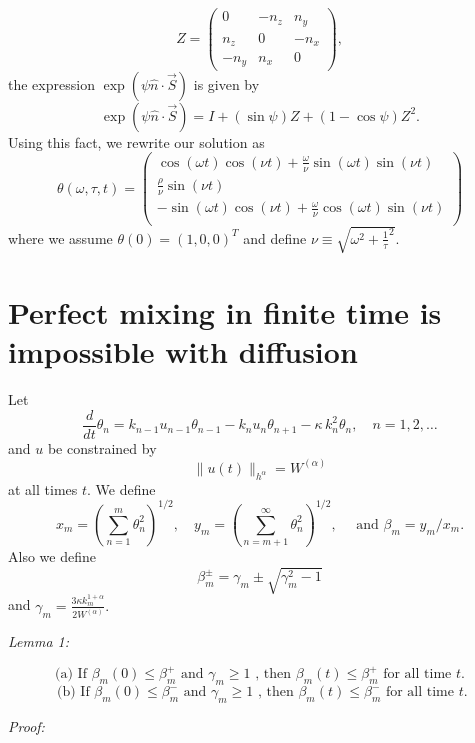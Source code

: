 \[
	Z=\left(
	\begin{array}{ccc}
		0      & -n_{z} & n_{y}  \\
		n_{z}  & 0      & -n_{x} \\
		-n_{y} & n_{x}  & 0
	\end{array}
	\right),
\]
the expression $\exp( \psi  \hat{n}\cdot \vec{S})$ is given by \cite{SLA2005}
\[\exp( \psi  \hat{n}\cdot \vec{S})=I+(\sin\psi)Z+(1-\cos\psi)Z^{2}.\]
Using this fact, we rewrite our solution as
\[
	\theta(\omega  , \tau, t)=
	\left(
	\begin{array}{c}
		\cos(\omega t) \cos(\nu t) + \frac{\omega}{\nu} \sin(\omega t) \sin(\nu t)  \\
		\frac{\rho}{\nu}  \sin(\nu t)                                               \\
		-\sin(\omega t) \cos(\nu t) + \frac{\omega}{\nu} \cos(\omega t) \sin(\nu t) \\
	\end{array}
	\right)
\]
where we assume $\theta(0)=(1, 0, 0)^{T}$  and define $\nu \equiv \sqrt{\omega^{2}+\frac{1}{\tau}^2}.$




\section{Perfect mixing in finite time is impossible with diffusion}
\label{appendix:pmift_impossible}

Let \begin{equation}
	\frac{d}{dt} \theta_{n}= k_{n-1}u_{n-1}\theta_{n-1}-k_{n}u_{n}\theta_{n+1} - \kappa \,  k_{n}^{2} \theta_{n}, \quad n=1,2,\dots
\end{equation}
and $u$ be constrained by
\begin{equation}
\label{eq:constraint}
\|u(t)\|_{h^{\alpha}}=W^{(\alpha)}
\end{equation}
at all times $t$. We define
\begin{equation}
\label{eq:xmymdef}
x_{m}=\left(\sum_{n=1}^{m}\theta_{n}^{2}\right)^{1/2}, \quad y_{m}=\left(\sum_{n=m+1}^{\infty}\theta_{n}^{2}\right)^{1/2}, \quad \text{ and } \beta_{m}=y_{m}/x_{m}.
\end{equation} 
Also we define \begin{equation*}
\beta_{m}^{\pm}=\gamma_{m}  \pm \sqrt{\gamma_{m}^{2}  - 1}
\end{equation*}
and $\gamma_{m} = \frac{3\kappa k_{m}^{1+\alpha} }{2W^{(\alpha)}}.$
\begin{flushleft}
{\it Lemma 1:} 
\end{flushleft}
\begin{equation}
\label{condtion_a} 
\text{ (a) If $\beta_{m}(0) \leq \beta_{m}^{+}$ and $\gamma_{m}\geq 1$ , then $\beta_{m}(t)\leq \beta_{m}^{+}$ for all time $t$. }
\end{equation}	
\begin{equation}
\label{condtion_b} 
\text{ (b) If $\beta_{m}(0) \leq \beta_{m}^{-}$ and $\gamma_{m}\geq 1$ , then $\beta_{m}(t)\leq \beta_{m}^{-}$ for all time $t$.}
\end{equation}
\begin{flushleft}
{\it Proof:}
\end{flushleft}

